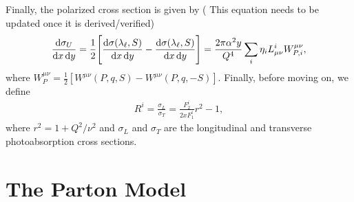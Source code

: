 \documentclass[aps,prd,amsmath,superscriptaddress,floatfix,nofootinbib]{revtex4-2}
\newcommand{\diff}[1]{{\rm d} #1}
\begin{document}
Finally, the polarized cross section is given by ({\color{red} This equation needs to be updated once it is derived/verified})
\begin{eqnarray}
    \label{eq:pol-xsec}
    \frac{\diff \sigma_{U}}{\diff x \, \diff y} = \frac{1}{2} \Bigg[ \frac{\diff \sigma(\lambda_{\ell},S)}{\diff x \, \diff y} - \frac{\diff \sigma(\lambda_{\ell},S)}{\diff x \, \diff y} \Bigg] = \frac{2 \pi \alpha^2 y}{Q^{4}} \sum_{i} \eta_{i} L_{\mu\nu}^{i} W^{\mu\nu}_{P,i}
,\end{eqnarray}
where $W^{\mu\nu}_{P} = \frac{1}{2} [ W^{\mu\nu}(P,q,S) - W^{\mu\nu}(P,q,-S) ]$.
Finally, before moving on, we define
\begin{eqnarray}
    \label{eq:ratio}
    R^{i} = \frac{\sigma_{L}}{\sigma_{T}} = \frac{F_{2}^{i}}{2xF_{1}^{i}} r^2 - 1
,\end{eqnarray}
where $r^2 = 1 + Q^2/\nu^2$ and $\sigma_{L}$ and $\sigma_{T}$ are the longitudinal and transverse photoabsorption cross sections.


\section{The Parton Model}
\label{sec:the-naive-parton-model}
\end{document}
